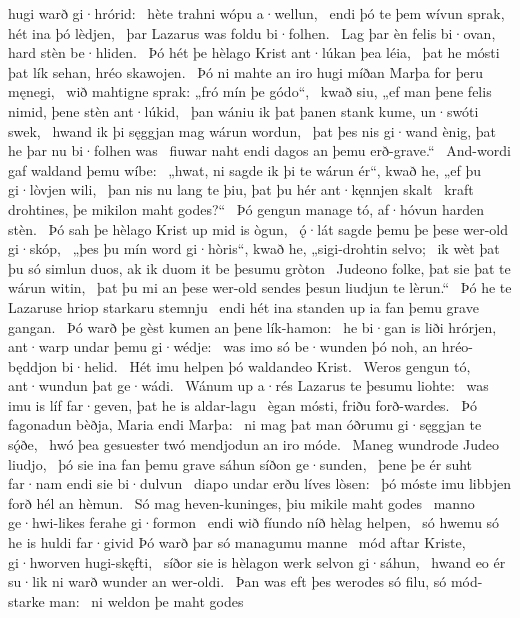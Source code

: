 hugi warð gi·hrórid: \hld\ hète trahni
wópu a·wellun, \hld\ endi þó te þem wívun sprak,
hét ina þó lèdjen, \hld\ þar Lazarus was
foldu bi·folhen. \hld\ Lag þar èn felis bi·ovan,
hard stèn be·hliden. \hld\ Þó hét þe hèlago Krist
ant·lúkan þea léia, \hld\ þat he mósti þat lík sehan,
hréo skawojen. \hld\ Þó ni mahte an iro hugi míðan
Marþa for þeru męnegi, \hld\ wið mahtigne sprak:
„fró mín þe gódo“, \hld\ kwað siu, „ef man þene felis nimid,
þene stèn ant·lúkid, \hld\ þan wániu ik þat þanen stank kume,
un·swóti swek, \hld\ hwand ik þi sęggjan mag
wárun wordun, \hld\ þat þes nis gi·wand ènig,
þat he þar nu bi·folhen was \hld\ fiuwar naht endi dagos
an þemu erð-grave.“ \hld\ And-wordi gaf
waldand þemu wíbe: \hld\ „hwat, ni sagde ik þi te wárun ér“, kwað he,
„ef þu gi·lòvjen wili, \hld\ þan nis nu lang te þiu,
þat þu hér ant·kęnnjen skalt \hld\ kraft drohtines,
þe mikilon maht godes?“ \hld\ Þó gengun manage tó,
af·hóvun harden stèn. \hld\ Þó sah þe hèlago Krist
up mid is ògun, \hld\ ǫ́·lát sagde %
þemu þe þese wer-old gi·skóp, \hld\ „þes þu mín word gi·hòris“, kwað he,
„sigi-drohtin selvo; \hld\ ik wèt þat þu só simlun duos,
ak ik duom it be þesumu gròton \hld\ Judeono folke,
þat sie þat te wárun witin, \hld\ þat þu mi an þese wer-old sendes
þesun liudjun te lèrun.“ \hld\ Þó he te Lazaruse hriop
starkaru stemnju \hld\ endi hét ina standen up
ia fan þemu grave gangan. \hld\ Þó warð þe gèst kumen
an þene lík-hamon: \hld\ he bi·gan is liði hrórjen,
ant·warp undar þemu gi·wédje: \hld\ was imo só be·wunden þó noh,
an hréo-będdjon bi·helid. \hld\ Hét imu helpen þó
waldandeo Krist. \hld\ Weros gengun tó,
ant·wundun þat ge·wádi. \hld\ Wánum up a·rés
Lazarus te þesumu liohte: \hld\ was imu is líf far·geven,
þat he is aldar-lagu \hld\ ègan mósti,
friðu forð-wardes. \hld\ Þó fagonadun bèðja,
Maria endi Marþa: \hld\ ni mag þat man óðrumu
gi·sęggjan te sǫ́ðe, \hld\ hwó þea gesuester twó
mendjodun an iro móde. \hld\ Maneg wundrode
Judeo liudjo, \hld\ þó sie ina fan þemu grave sáhun
síðon ge·sunden, \hld\ þene þe ér suht far·nam
endi sie bi·dulvun \hld\ diapo undar erðu
líves lòsen: \hld\ þó móste imu libbjen forð
hél an hèmun. \hld\ Só mag heven-kuninges,
þiu mikile maht godes \hld\ manno ge·hwi-likes
ferahe gi·formon \hld\ endi wið fíundo níð
hèlag helpen, \hld\ só hwemu só he is huldi far·givid
Þó warð þar só managumu manne \hld\ mód aftar Kriste,
gi·hworven hugi-skęfti, \hld\ síðor sie is hèlagon werk
selvon gi·sáhun, \hld\ hwand eo ér su·lik ni warð
wunder an wer-oldi. \hld\ Þan was eft þes werodes só filu,
só mód-starke man: \hld\ ni weldon þe maht godes
